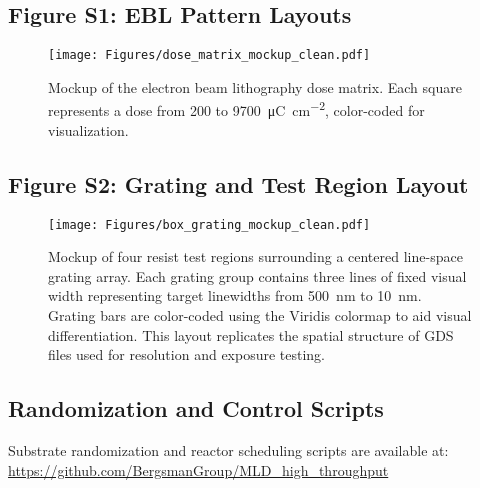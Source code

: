 \subsection*{Figure S1: EBL Pattern Layouts}
\begin{figure}[htbp]
  \centering
  \texttt{[image: Figures/dose\_matrix\_mockup\_clean.pdf]}
  \caption{Mockup of the electron beam lithography dose matrix. Each square represents a dose from 200 to 9700~\si{\micro\coulomb\per\centi\meter\squared}, color-coded for visualization.}
  \label{fig:dosematrix}
\end{figure}

\subsection*{Figure S2: Grating and Test Region Layout}
\begin{figure}[htbp]
  \centering
  \texttt{[image: Figures/box\_grating\_mockup\_clean.pdf]}
  \caption{Mockup of four resist test regions surrounding a centered line-space grating array. Each grating group contains three lines of fixed visual width representing target linewidths from 500~nm to 10~nm. Grating bars are color-coded using the Viridis colormap to aid visual differentiation. This layout replicates the spatial structure of GDS files used for resolution and exposure testing.}
  \label{fig:sfig:grating}
\end{figure}


\subsection*{Randomization and Control Scripts}
Substrate randomization and reactor scheduling scripts are available at:  
\url{https://github.com/BergsmanGroup/MLD_high_throughput}
